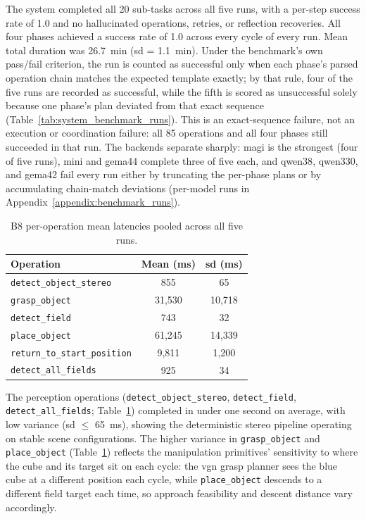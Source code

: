 \documentclass[
     12pt,
     a4paper,
     BCOR=10mm,
     DIV=14,
     listof=totoc,
     bibliography=totoc,
     parskip,
     twoside,
     headsepline
     ]{scrreprt}
\begin{document}
The system completed all 20 sub-tasks across all five runs, with a per-step success rate of 1.0 and no hallucinated operations, retries, or reflection recoveries. All four phases achieved a success rate of 1.0 across every cycle of every run. Mean total duration was 26.7~min (\gls{sd} = 1.1~min). Under the benchmark's own pass/fail criterion, the run is counted as successful only when each phase's parsed operation chain matches the expected template exactly; by that rule, four of the five runs are recorded as successful, while the fifth is scored as unsuccessful solely because one phase's plan deviated from that exact sequence (Table~\ref{tab:system_benchmark_runs}). This is an exact-sequence failure, not an execution or coordination failure: all 85 operations and all four phases still succeeded in that run. The backends separate sharply: \gls{magi} is the strongest (four of five runs), \gls{mini} and \gls{gema44} complete three of five each, and \gls{qwen38}, \gls{qwen330}, and \gls{gema42} fail every run either by truncating the per-phase plans or by accumulating chain-match deviations (per-model runs in Appendix~\ref{appendix:benchmark_runs}).

\begin{table}[ht]
	\centering
	\begin{tabular}{lcc}
		\hline
		\textbf{Operation}                   & \textbf{Mean (ms)} & \textbf{\gls{sd} (ms)} \\
		\hline
		\texttt{detect\_object\_stereo}      & 855                & 65                     \\
		\texttt{grasp\_object}               & 31{,}530           & 10{,}718               \\
		\texttt{detect\_field}               & 743                & 32                     \\
		\texttt{place\_object}               & 61{,}245           & 14{,}339               \\
		\texttt{return\_to\_start\_position} & 9{,}811            & 1{,}200                \\
		\texttt{detect\_all\_fields}         & 925                & 34                     \\
		\hline
	\end{tabular}
	\caption{B8 per-operation mean latencies pooled across all five runs.}
	\label{tab:b8-latency}
\end{table}

The perception operations (\texttt{detect\_object\_stereo}, \texttt{detect\_field}, \texttt{detect\_all\_fields}; Table~\ref{tab:b8-latency}) completed in under one second on average, with low variance (\gls{sd} $\le$ 65~ms), showing the deterministic stereo pipeline operating on stable scene configurations. The higher variance in \texttt{grasp\_object} and \texttt{place\_object} (Table~\ref{tab:b8-latency}) reflects the manipulation primitives' sensitivity to where the cube and its target sit on each cycle: the \gls{vgn} grasp planner sees the blue cube at a different position each cycle, while \texttt{place\_object} descends to a different field target each time, so approach feasibility and descent distance vary accordingly.
\end{document}
